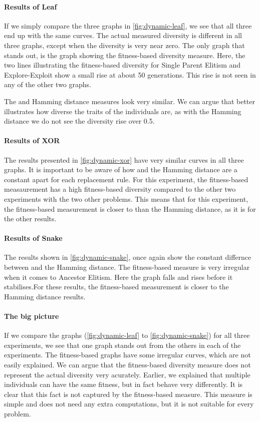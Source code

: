 \paragraph{Results of Leaf} If we simply compare the three graphs in \cref{fig:dynamic-leaf}, we see that all three end up with the same curves. The actual measured diversity is different in all three graphs, except when the diversity is very near zero. The only graph that stands out, is the graph showing the fitness-based diversity measure. Here, the two lines illustrating the fitness-based diversity for Single Parent Elitism and Explore-Exploit show a small rise at about \num{50} generations. This rise is not seen in any of the other two graphs. 

The \dia{} and Hamming distance measures look very similar. We can argue that \dia{} better illustrates how diverse the traits of the individuals are, as with the Hamming distance we do not see the diversity rise over \num{0.5}. 

\paragraph{Results of XOR} The results presented in \cref{fig:dynamic-xor} have very similar curves in all three graphs. It is important to be aware of how \dia{} and the Hamming distance are a constant apart for each replacement rule. For this experiment, the fitness-based measaurement has a high fitness-based diversity compared to the other two experiments with the two other problems. This means that for this experiment, the fitness-based measurement is closer to \dia{} than the Hamming distance, as it is for the other results.

\paragraph{Results of Snake} The results shown in \cref{fig:dynamic-snake}, once again show the constant differnce between \dia{} and the Hamming distance. The fitness-based measure is very irregular when it comes to Ancestor Elitism. Here the graph falls and rises before it stabilises.For these results, the fitness-based measurement is closer to the Hamming distance results.

\paragraph{The big picture} If we compare the graphs (\cref{fig:dynamic-leaf} to \cref{fig:dynamic-snake}) for all three experiments, we see that one graph stands out from the others in each of the experiments. The fitness-based graphs have some irregular curves, which are not easily explained. We can argue that the fitness-based diversity measure does not represent the actual diversity very acurately. Earlier, we explained that multiple individuals can have the same fitness, but in fact behave very differently. It is clear that this fact is not captured by the fitness-based measure. This measure is simple and does not need any extra computations, but it is not suitable for every problem. 


